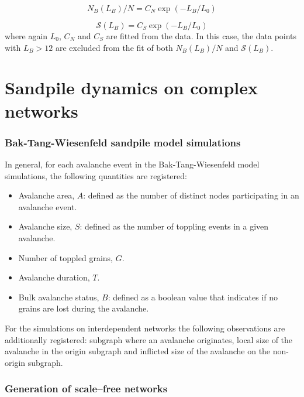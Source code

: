 \begin{equation}
	N_B(L_B) / N = C_N \exp(-L_B / L_0)
	\label{eq:N_non_fractal_SM}
\end{equation}

\begin{equation}
	\mathcal{S}(L_B) = C_S \exp(-L_B / L_0)
	\label{eq:S_non_fractal_SM}
\end{equation}
where again $L_0$, $C_N$ and $C_S$ are fitted from the data. In this case, the data points with $L_B > 12$ are excluded from the fit of both $N_B(L_B) / N$ and $\mathcal{S}(L_B)$.



\section{Sandpile dynamics on complex networks}
\label{sec:SOC_SM}

\subsubsection*{Bak-Tang-Wiesenfeld sandpile model simulations}

In general, for each avalanche event in the Bak-Tang-Wiesenfeld model simulations, the following quantities are registered:
\begin{itemize}
	\item Avalanche area, $A$: defined as the number of distinct nodes participating in an avalanche event.
	\item Avalanche size, $S$: defined as the number of toppling events in a given avalanche.
	\item Number of toppled grains, $G$.
	\item Avalanche duration, $T$.
	\item Bulk avalanche status, $B$: defined as a boolean value that indicates if no grains are lost during the avalanche.
\end{itemize}

For the simulations on interdependent networks the following observations are additionally registered: subgraph where an avalanche originates, local size of the avalanche in the origin subgraph and inflicted size of the avalanche on the non-origin subgraph.

\subsubsection*{Generation of scale--free networks}

